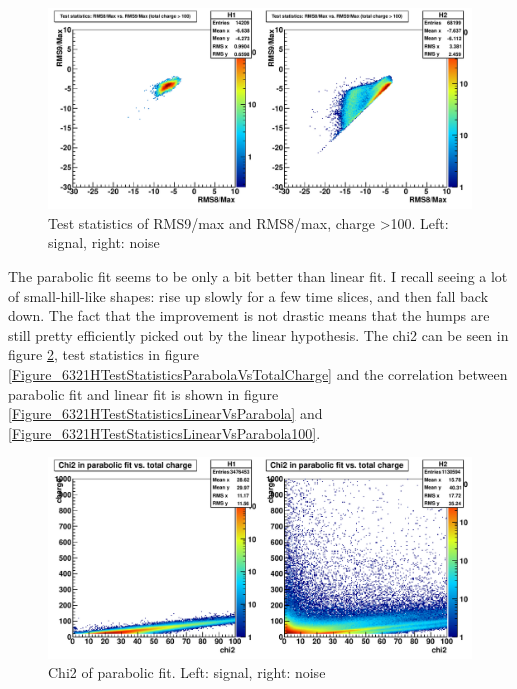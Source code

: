 \begin{figure}
\includegraphics[width=120mm]{DailyLog/6321/6321HTestStatisticsRMS8OverMaxVsRMS9OverMax100.pdf}
\caption{Test statistics of RMS9/max and RMS8/max, charge \textgreater 100.  Left: signal, right: noise}
\label{Figure_6321HTestStatisticsRMS8OverMaxVsRMS9OverMax100}
\end{figure}


The parabolic fit seems to be only a bit better than linear fit.
I recall seeing a lot of small-hill-like shapes: rise up slowly for a few time slices, and then fall back down.
The fact that the improvement is not drastic means that the humps are still pretty efficiently picked out by the linear hypothesis.
The chi2 can be seen in figure \ref{Figure_6321HParabolaChi2VsTotalCharge},
test statistics in figure \ref{Figure_6321HTestStatisticsParabolaVsTotalCharge}
and the correlation between parabolic fit and linear fit is shown in figure \ref{Figure_6321HTestStatisticsLinearVsParabola}
and \ref{Figure_6321HTestStatisticsLinearVsParabola100}.

\begin{figure}
\includegraphics[width=120mm]{DailyLog/6321/6321HParabolaChi2VsTotalCharge.pdf}
\caption{Chi2 of parabolic fit.  Left: signal, right: noise}
\label{Figure_6321HParabolaChi2VsTotalCharge}
\end{figure}

